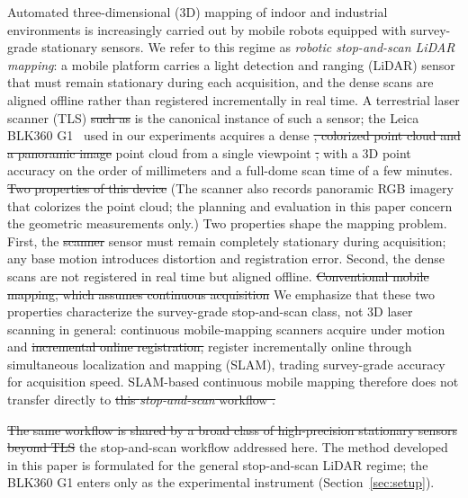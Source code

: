 \documentclass[sensors,article,submit,pdftex,moreauthors]{Definitions/mdpi}
\providecommand{\DIFadd}[1]{{\protect\color{blue} \sf #1}} %
\providecommand{\DIFdel}[1]{{\protect\color{red}\protect\scriptsize\protect\sout{#1}}} %
\providecommand{\DIFaddbegin}{} %
\providecommand{\DIFaddend}{} %
\providecommand{\DIFdelbegin}{} %
\providecommand{\DIFdelend}{} %
\begin{document}
Automated three-dimensional (3D) mapping of indoor and industrial environments
is increasingly carried out by mobile robots equipped with survey-grade
stationary sensors. \DIFaddbegin \DIFadd{We refer to this regime as \emph{robotic stop-and-scan
LiDAR mapping}: a mobile platform carries a light detection and ranging (LiDAR)
sensor that must remain stationary during each acquisition, and the dense scans
are aligned offline rather than registered incrementally in real time. }\DIFaddend A
terrestrial laser scanner (TLS) \DIFdelbegin \DIFdel{such as }\DIFdelend \DIFaddbegin \DIFadd{is the canonical instance of such a sensor; }\DIFaddend the
Leica BLK360 G1~\cite{leica-blk360} \DIFaddbegin \DIFadd{used in our experiments }\DIFaddend acquires a dense
\DIFdelbegin \DIFdel{, colorized point cloud and a panoramic
image }\DIFdelend \DIFaddbegin \DIFadd{point cloud }\DIFaddend from a single viewpoint \DIFdelbegin \DIFdel{, }\DIFdelend with a 3D point accuracy on the order of
millimeters and a full-dome scan time of a few minutes. \DIFdelbegin \DIFdel{Two properties of this
device }\DIFdelend \DIFaddbegin \DIFadd{(The scanner also
records panoramic RGB imagery that colorizes the point cloud; the planning and
evaluation in this paper concern the geometric measurements only.) Two
properties }\DIFaddend shape the mapping problem. First, the \DIFdelbegin \DIFdel{scanner }\DIFdelend \DIFaddbegin \DIFadd{sensor }\DIFaddend must remain completely
stationary during acquisition; any base motion introduces distortion and
registration error. Second, the dense scans are not registered in real time but
aligned offline. \DIFdelbegin \DIFdel{Conventional mobile mapping, which assumes continuous
acquisition }\DIFdelend \DIFaddbegin \DIFadd{We emphasize that these two properties characterize the
survey-grade stop-and-scan class, not 3D laser scanning in general: continuous
mobile-mapping scanners acquire }\DIFaddend under motion and \DIFdelbegin \DIFdel{incremental online
registration, }\DIFdelend \DIFaddbegin \DIFadd{register incrementally online
through simultaneous localization and mapping (SLAM), trading survey-grade
accuracy for acquisition speed. SLAM-based continuous mobile mapping }\DIFaddend therefore
does not transfer directly to \DIFdelbegin \DIFdel{this \emph{stop-and-scan} workflow .
}%

\DIFdel{The same workflow is shared by a broad class of high-precision stationary
sensors beyond TLS}\DIFdelend \DIFaddbegin \DIFadd{the stop-and-scan workflow addressed here. The method developed in this
paper is formulated for the general stop-and-scan LiDAR regime; the BLK360 G1
enters only as the experimental instrument (Section~\ref{sec:setup}).
}
\end{document}
